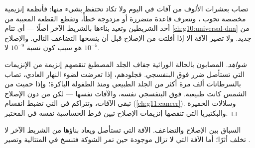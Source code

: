 \begin{proposition}\label{prop:g11:mutations:repair}
تصاب  بعشرات الألوف من آفات  في اليوم ولا تكاد تحتفظ بشيء
منها: فأنظمة إنزيمية مخصصة تجوب ، وتتعرف قاعدة متضررة أو
مزدوجة خطأً، وتقطع القطعة المعيبة من أحد الشريطين وتعيد بناءها
بالشريط الآخر أصلًا --- أي تتام \cref{ch:g10:universal-dna} من جديد.
ولا تصير الآفة  إلا إذا أفلتت من الإصلاح قبل أن ينسخها التضاعف
التالي. والإصلاح هو سبب كون نسبة  $10^{-9}$ لا $10^{-5}$.
\end{proposition}
\begin{proof}[شواهد]
المصابون بالحالة الوراثية جفاف الجلد المصطبغ تنقصهم إنزيمة من
الإنزيمات التي تستأصل ضرر فوق البنفسجي. فجلودهم، إذا تعرضت لضوء النهار
العادي، تصاب بالسرطانات ألف مرة أكثر من الجلد الطبيعي ومنذ الطفولة
الباكرة؛ وإذا حميت من الشمس كانت طبيعية. فوق البنفسجي نفسه، والآفات
نفسها --- لكن من دون الإصلاح تبقى الآفات، وتتراكم  في
 التي تضبط انقسام  (\cref{ch:g11:cancer}). وسلالات
الخميرة والبكتيريا التي تنقصها إنزيمات الإصلاح تبين فرط الحساسية نفسه
في المختبر.
\end{proof}

\begin{omfigure}

{\small السباق بين الإصلاح والتضاعف. الآفة التي تستأصل ويعاد بناؤها من
الشريط الآخر لا تخلف أثرًا؛ أما الآفة التي لا تزال موجودة حين تمر
الشوكة فتنسخ في المتتالية وتصير .}
\end{omfigure}


